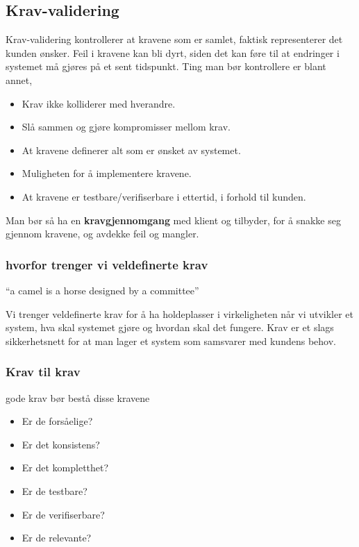 \documentclass[11pt]{article}
\begin{document}
\subsection{Krav-validering}
\label{sec-6.3}

   Krav-validering kontrollerer at kravene som er samlet, faktisk
   representerer det kunden ønsker. Feil i kravene kan bli dyrt, siden
   det kan føre til at endringer i systemet må gjøres på et sent
   tidspunkt. Ting man bør kontrollere er blant annet,

\begin{itemize}
\item Krav ikke kolliderer med hverandre.
\item Slå sammen og gjøre kompromisser mellom krav.
\item At kravene definerer alt som er ønsket av systemet.
\item Muligheten for å implementere kravene.
\item At kravene er testbare/verifiserbare i ettertid, i forhold til kunden.
\end{itemize}

   Man bør så ha en \textbf{kravgjennomgang} med klient og tilbyder, for å
   snakke seg gjennom kravene, og avdekke feil og mangler.
\subsubsection{hvorfor trenger vi veldefinerte krav}
\label{sec-6.3.1}


    ``a camel is a horse designed by a committee''

    Vi trenger veldefinerte krav for å ha holdeplasser i virkeligheten
    når vi utvikler et system, hva skal systemet gjøre og hvordan
    skal det fungere. Krav er et slags sikkerhetsnett for at man lager et 
    system som samsvarer med kundens behov. 
\subsubsection{Krav til krav}
\label{sec-6.3.2}

    gode krav bør bestå disse kravene
\begin{itemize}
\item Er de forsåelige?
\item Er det konsistens?
\item Er det kompletthet?
\item Er de testbare?
\item Er de verifiserbare?
\item Er de relevante?
\end{itemize}
\end{document}
